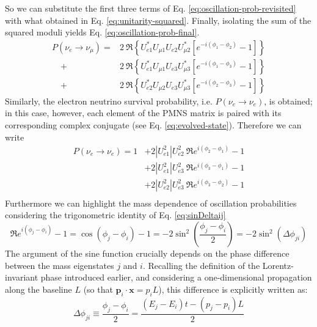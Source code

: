 So we can substitute the first three terms of Eq. \ref{eq:oscillation-prob-revisited} with what obtained in Eq. \ref{eq:unitarity-squared}.
Finally, isolating the sum of the squared moduli yields Eq. \ref{eq:oscillation-prob-final}.
\begin{equation}
    \label{eq:oscillation-prob-final}
    \begin{aligned}
        P(\nu_e \to \nu_\mu) = &2~\Re \left\{ U_{e1}^* U_{\mu 1} U_{e2} U_{\mu 2}^* \left[ e^{-i(\phi_1 - \phi_2)} - 1 \right] \right\} \\
        \quad + &2~\Re \left\{ U_{e1}^* U_{\mu 1} U_{e3} U_{\mu 3}^* \left[ e^{-i(\phi_1 - \phi_3)} - 1 \right] \right\} \\
        \quad + &2~\Re \left\{ U_{e2}^* U_{\mu 2} U_{e3} U_{\mu 3}^* \left[ e^{-i(\phi_2 - \phi_3)} - 1 \right] \right\}
    \end{aligned}
\end{equation}
Similarly, the electron neutrino survival probability, i.e. $P(\nu_e \to \nu_e)$, is obtained; in this case, however, 
each element of the PMNS matrix is paired with its corresponding complex conjugate (see Eq. \ref{eq:evolved-state}).
Therefore we can write
\begin{equation*}
    \begin{aligned}
    P(\nu_e \to \nu_e) = 1 &+ 2 |U_{e1}^2|U_{e2}^2 ~\Re{e^{i(\phi_2-\phi_1)}-1}\\
                                        &+ 2 |U_{e1}^2|U_{e3}^2 ~\Re{e^{i(\phi_3-\phi_1)}-1}\\
                                        &+ 2 |U_{e2}^2|U_{e3}^2 ~\Re{e^{i(\phi_3-\phi_2)}-1}\\
    \end{aligned}
\end{equation*}
Furthermore we can highlight the mass dependence of oscillation probabilities considering the trigonometric identity of Eq. \ref{eq:sinDeltaij}
\begin{equation}
    \label{eq:sinDeltaij}
    \Re {e^{i(\phi_j-\phi_i)}-1} = \cos(\phi_j-\phi_i) - 1 = -2 \sin^2\left(\frac{\phi_j-\phi_i}{2}\right) = -2 \sin^2(\Delta \phi_{ji})
\end{equation}
The argument of the sine function crucially depends on the phase difference between the mass eigenstates $j$ and $i$. 
Recalling the definition of the Lorentz-invariant phase introduced earlier, and considering a one-dimensional propagation along the baseline 
$L$ (so that $\mathbf{p}_i \cdot \mathbf{x} = p_i L$), this difference is explicitly written as:
\begin{equation}
    \label{eq:phase-diff-general}
    \Delta\phi_{ji} \equiv \frac{\phi_j - \phi_i}{2} = \frac{(E_j - E_i)t - (p_j - p_i)L}{2}
\end{equation}

